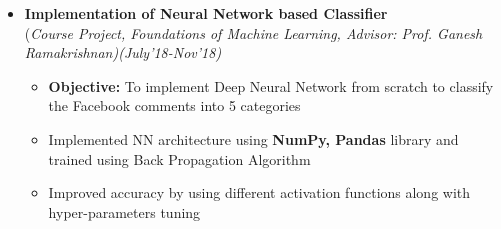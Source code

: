 \documentclass[a4paper,10pt]{article}
\begin{document}
\begin{itemize}
\item \textbf{Implementation of Neural Network based Classifier} \\ 
(\emph{Course Project, Foundations of Machine Learning, Advisor: Prof. Ganesh Ramakrishnan)\hfill (July'18-Nov’18)} \\[-0.4cm]
	\begin{itemize}[noitemsep,nolistsep]
	\item \textbf{Objective:} To implement Deep Neural Network from scratch to classify the Facebook comments into 5 categories %
    \item Implemented NN architecture using \textbf{NumPy, Pandas} library and trained using Back Propagation Algorithm
    \item Improved accuracy by using different activation functions along with hyper-parameters tuning
	\end{itemize}




\end{itemize}
\end{document}
